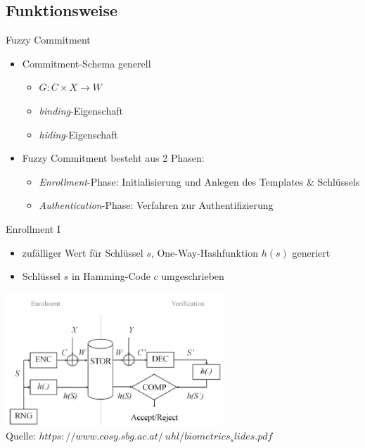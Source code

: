 \documentclass{beamer}
\begin{document}
\subsection{Funktionsweise}
\begin{frame}{Fuzzy Commitment}
	\begin{itemize}
		\item Commitment-Schema generell
		\begin{itemize}
			\item $G : C\times X \rightarrow W$
			\item \textit{binding}-Eigenschaft
			\item \textit{hiding}-Eigenschaft
		\end{itemize}
		\item Fuzzy Commitment besteht aus 2 Phasen:
		\begin{itemize}
			\item \textit{Enrollment}-Phase: Initialisierung und Anlegen des Templates \& Schl\"ussels
			\item \textit{Authentication}-Phase: Verfahren zur Authentifizierung 
		\end{itemize}
	\end{itemize}
\end{frame}
\begin{frame}{Enrollment I}
	\begin{itemize}
		\item zuf\"alliger Wert f\"ur Schl\"ussel $s$, One-Way-Hashfunktion $h(s)$ generiert
		\item Schl\"ussel $s$ in Hamming-Code $c$ umgeschrieben
	\end{itemize}
	\hspace{10mm}\includegraphics[height=5cm]{fcs.png}\\
	\tiny{Quelle: \textit{\tiny{$https://www.cosy.sbg.ac.at/~uhl/biometrics_slides.pdf$}}}
\end{frame}
\end{document}
